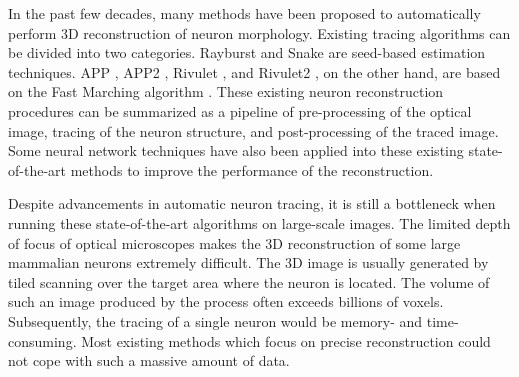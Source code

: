 \documentclass[conference]{IEEEtran}
\begin{document}
In the past few decades, many methods have been proposed to automatically perform 3D reconstruction of neuron morphology. Existing tracing algorithms can be divided into two categories. Rayburst \cite{rayburst} and Snake \cite{snake, snake2, snake3} are seed-based estimation techniques. APP \cite{app}, APP2 \cite{app2}, Rivulet \cite{r1_1, r1_2}, and Rivulet2 \cite{r2}, on the other hand, are based on the Fast Marching algorithm \cite{fm-sethian}. These existing neuron reconstruction procedures can be summarized as a pipeline of pre-processing of the optical image, tracing of the neuron structure, and post-processing of the traced image. Some neural network techniques \cite{li2017deep,25dcrossingsiqi,He2018} have also been applied into these existing state-of-the-art methods \cite{r1_1, r1_2, r2, app, app2, most, rayburst, fm-basu} to improve the performance of the reconstruction.



Despite advancements in automatic neuron tracing, it is still a bottleneck when running these state-of-the-art algorithms on large-scale images. The limited depth of focus of optical microscopes makes the 3D reconstruction of some large mammalian neurons extremely difficult. The 3D image is usually generated by tiled scanning over the target area where the neuron is located. The volume of such an image produced by the process often exceeds billions of voxels. Subsequently, the tracing of a single neuron would be memory- and time-consuming. Most existing methods which focus on precise reconstruction could not cope with such a massive amount of data.
\end{document}
